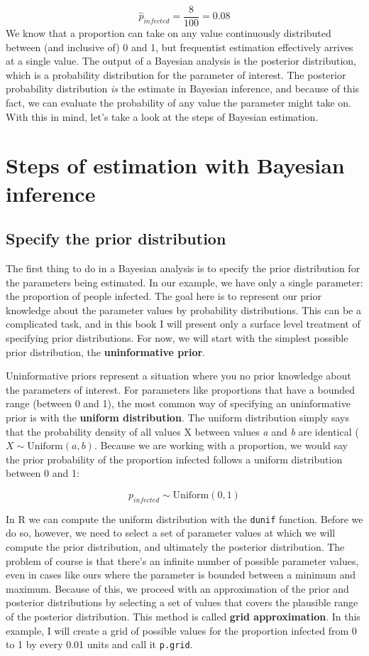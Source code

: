 \documentclass[
]{book}
\begin{document}
\[
\hat{p}_{infected}=\frac{8}{100}=0.08
\]
We know that a proportion can take on any value continuously distributed between (and inclusive of) 0 and 1, but frequentist estimation effectively arrives at a single value. The output of a Bayesian analysis is the posterior distribution, which is a probability distribution for the parameter of interest. The posterior probability distribution \emph{is} the estimate in Bayesian inference, and because of this fact, we can evaluate the probability of any value the parameter might take on. With this in mind, let's take a look at the steps of Bayesian estimation.

\section{Steps of estimation with Bayesian inference}\label{steps-of-estimation-with-bayesian-inference}

\subsection{Specify the prior distribution}\label{specify-the-prior-distribution}

The first thing to do in a Bayesian analysis is to specify the prior distribution for the parameters being estimated. In our example, we have only a single parameter: the proportion of people infected. The goal here is to represent our prior knowledge about the parameter values by probability distributions. This can be a complicated task, and in this book I will present only a surface level treatment of specifying prior distributions. For now, we will start with the simplest possible prior distribution, the \textbf{uninformative prior}.

Uninformative priors represent a situation where you no prior knowledge about the parameters of interest. For parameters like proportions that have a bounded range (between 0 and 1), the most common way of specifying an uninformative prior is with the \textbf{uniform distribution}. The uniform distribution simply says that the probability density of all values X between values \emph{a} and \emph{b} are identical (\(X\sim \text{Uniform}(a, b)\). Because we are working with a proportion, we would say the prior probability of the proportion infected follows a uniform distribution between 0 and 1:

\[
p_{infected}\sim \text{Uniform}(0, 1)
\]

In R we can compute the uniform distribution with the \texttt{dunif} function. Before we do so, however, we need to select a set of parameter values at which we will compute the prior distribution, and ultimately the posterior distribution. The problem of course is that there's an infinite number of possible parameter values, even in cases like ours where the parameter is bounded between a minimum and maximum. Because of this, we proceed with an approximation of the prior and posterior distributions by selecting a set of values that covers the plausible range of the posterior distribution. This method is called \textbf{grid approximation}. In this example, I will create a grid of possible values for the proportion infected from 0 to 1 by every 0.01 units and call it \texttt{p.grid}.
\end{document}
